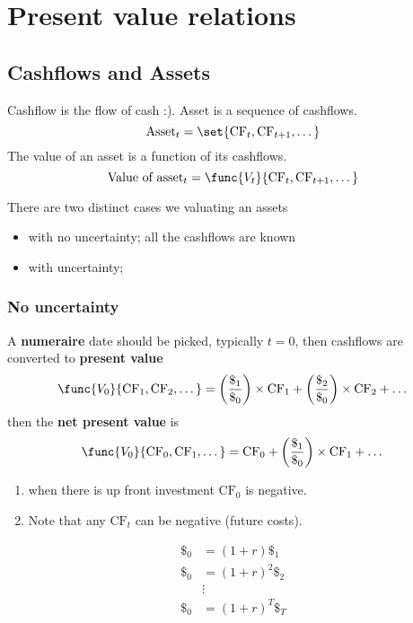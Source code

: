 \chapter{Present value relations}
\section{Cashflows and Assets}
Cashflow is the flow of cash :). Asset is a sequence of cashflows.
\begin{equation*}
    \text{Asset}_t = \set{\text{CF}_t , \text{CF}_{t+1} , \dots }
\end{equation*}
The value of an asset is a function of its cashflows.
\begin{equation*}
    \text{Value of asset}_t = \func{V_t}{\text{CF}_t , \text{CF}_{t+1} , \dots}
\end{equation*}

There are two distinct cases we valuating an assets
\begin{itemize}
    \item with no uncertainty; all the cashflows are known
    \item with uncertainty;
\end{itemize}
\subsection{No uncertainty}
A \textbf{numeraire} date should be picked, typically \(t = 0\), then cashflows are converted to \textbf{present value}
\begin{equation*}
    \func{V_0}{\text{CF}_1 , \text{CF}_{2} , \dots} = \left(\dfrac{\$_1}{\$_0} \right)\times \text{CF}_1  + \left(\dfrac{\$_2}{\$_0} \right)\times \text{CF}_2 + \dots
\end{equation*}
then the \textbf{net present value} is
\begin{equation*}
    \func{V_0}{\text{CF}_0 , \text{CF}_{1} , \dots} = \text{CF}_0 +  \left(\dfrac{\$_1}{\$_0} \right)\times \text{CF}_1  +  \dots
\end{equation*}
\begin{enumerate}
    \item when there is up front investment \(\text{CF}_0\) is negative.
    \item Note that any \(\text{CF}_t\) can be negative (future costs).
\end{enumerate}

\begin{align*}
    \$_0 & = (1 + r) \$_1   \\
    \$_0 & = (1 + r)^2 \$_2 \\
         & \vdots           \\
    \$_0 & = (1 + r)^T \$_T \\
\end{align*}

